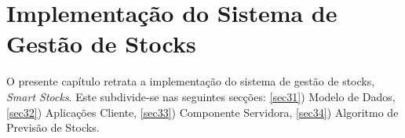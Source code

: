 %
%
\chapter{Implementação do Sistema de Gestão de Stocks} \label{cap3}

O presente capítulo retrata a implementação do sistema de gestão de stocks, \textit{Smart Stocks}. Este subdivide-se nas seguintes secções: \ref{sec31}) Modelo de Dados, \ref{sec32}) Aplicações Cliente, \ref{sec33}) Componente Servidora, \ref{sec34}) Algoritmo de Previsão de Stocks.




